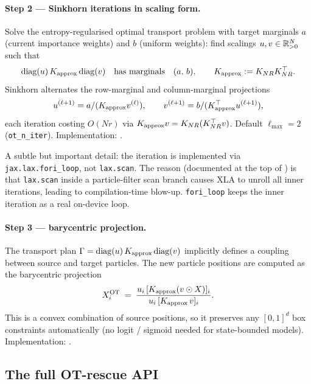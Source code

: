 \paragraph{Step 2 --- Sinkhorn iterations in scaling form.}
Solve the entropy-regularised optimal transport problem with target
marginals $a$ (current importance weights) and $b$ (uniform weights):
find scalings $u, v \in \mathbb{R}^N_{>0}$ such that
\begin{equation}
\mathrm{diag}(u)\, K_{\rm approx}\, \mathrm{diag}(v)
\quad\text{has marginals}\quad (a,\, b),
\qquad K_{\rm approx} := K_{NR} K_{NR}^\top.
\end{equation}
Sinkhorn alternates the row-marginal and column-marginal projections
\begin{equation}
u^{(\ell+1)} = a / (K_{\rm approx} v^{(\ell)}),
\qquad
v^{(\ell+1)} = b / (K_{\rm approx}^\top u^{(\ell+1)}),
\end{equation}
each iteration costing $O(N r)$ via $K_{\rm approx} v = K_{NR}
(K_{NR}^\top v)$. Default $\ell_{\max} = 2$ (\texttt{ot\_n\_iter}).
Implementation: .

A subtle but important detail: the iteration is implemented via
\texttt{jax.lax.fori\_loop}, not \texttt{lax.scan}. The reason
(documented at the top of ) is that \texttt{lax.scan}
inside a particle-filter scan branch causes XLA to unroll all
inner iterations, leading to compilation-time blow-up. \texttt{fori\_loop}
keeps the inner iteration as a real on-device loop.

\paragraph{Step 3 --- barycentric projection.}
The transport plan
$\Gamma = \mathrm{diag}(u)\, K_{\rm approx}\, \mathrm{diag}(v)$
implicitly defines a coupling between source and target particles. The
new particle positions are computed as the barycentric projection
\begin{equation}
X_i^{\rm OT} \;=\;
   \frac{u_i \, [K_{\rm approx} (v \odot X)]_i}
        {u_i \, [K_{\rm approx}\, v]_i}.
\label{eq:barycentric}
\end{equation}
This is a convex combination of source positions, so it preserves any
$[0, 1]^d$ box constraints automatically (no logit / sigmoid needed
for state-bounded models). Implementation:
.

\subsection{The full OT-rescue API}

